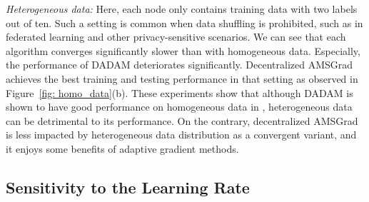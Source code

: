 \documentclass[11pt]{article}
\begin{document}
\textit{Heterogeneous data:}
Here, each node only contains training data with two labels out of ten. {Such a setting is common when data shuffling is prohibited, such as in  federated learning and other privacy-sensitive scenarios.}
We can see that each algorithm converges significantly slower than with homogeneous data. 
Especially, the performance of DADAM deteriorates significantly. 
Decentralized AMSGrad achieves the best training and testing performance in that setting as observed in Figure~\ref{fig: homo_data}(b). These experiments show that although DADAM is shown to have good performance on homogeneous data in 
 \citet{nazari2019dadam}, heterogeneous data can be detrimental to its performance. On the contrary, decentralized AMSGrad is less impacted by heterogeneous data distribution as a convergent variant, and it enjoys some benefits of adaptive gradient methods.
 
\subsection{Sensitivity to the Learning Rate}
% 


\end{document}
